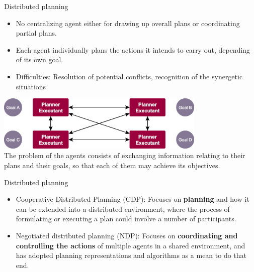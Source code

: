 \documentclass[9pt]{beamer}
\newcommand{\red}[1]{\textcolor{CS-1}{#1}}
\newcommand{\nok}{\red{\ding{55}}}
\newcommand{\itemNo}{\item[\nok]}
\begin{document}
\begin{frame}{Distributed planning}
\begin{small}
\begin{itemize}
\item \textcolor{CS-1light}{No centralizing} agent either for drawing up overall plans or coordinating partial plans. 
\item \textcolor{CS-1light}{Each agent individually plans} the actions it intends to carry out, depending of its own goal. 
\itemNo Difficulties: Resolution of potential conflicts, recognition of the synergetic situations
\end{itemize}

\vspace{4mm}

\begin{center}
\includegraphics[keepaspectratio, width=0.75\textwidth]{images/mas_planning_distributed.eps}\\
{\footnotesize The problem of the agents consists of exchanging information relating to their plans and their goals, so that each of them may achieve its objectives.} 
\end{center}
\end{small}
\end{frame}

\begin{frame}{Distributed planning}
\begin{small}
\begin{itemize}
\item \textcolor{CS-1light}{Cooperative Distributed Planning (CDP)}: Focuses on \textbf{planning} and how it can be extended into a distributed environment, where the process of formulating or executing a plan could involve a number of participants. 
\item \textcolor{CS-1light}{Negotiated distributed planning (NDP)}: Focuses on \textbf{coordinating and controlling the actions} of multiple agents in a shared environment, and has adopted planning representations and algorithms as a mean to do that end. 
\end{itemize}
\end{small}
\end{frame}
\end{document}
